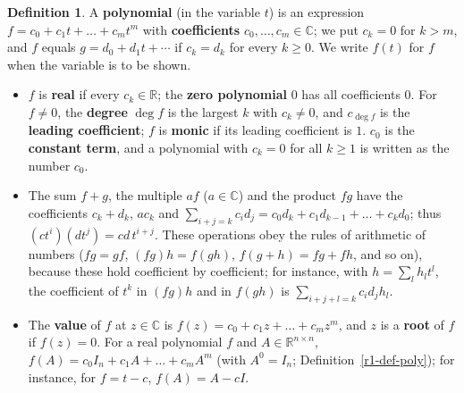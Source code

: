\documentclass[12pt]{article}
\newcommand{\R}{\mathbb R}
\theoremstyle{definition}
\newtheorem{definition}[theorem]{Definition}
\begin{document}
\begin{definition}\label{r7-def-polynomial}
A \textbf{polynomial} (in the variable \(t\)) is an expression \(f=c_0+c_1t+\dots+c_mt^m\) with \textbf{coefficients}
\(c_0,\dots,c_m\in\mathbb C\); we put \(c_k=0\) for \(k>m\), and \(f\) equals \(g=d_0+d_1t+\cdots\) if \(c_k=d_k\) for every
\(k\geqslant0\). We write \(f(t)\) for \(f\) when the variable is to be shown.
\begin{itemize}
\item \(f\) is \textbf{real} if every \(c_k\in\R\); the \textbf{zero polynomial} \(0\) has all coefficients \(0\). For
\(f\ne0\), the \textbf{degree} \(\deg f\) is the largest \(k\) with \(c_k\ne0\), and \(c_{\deg f}\) is the
\textbf{leading coefficient}; \(f\) is \textbf{monic} if its leading coefficient is \(1\). \(c_0\) is the
\textbf{constant term}, and a polynomial with \(c_k=0\) for all \(k\geqslant1\) is written as the number \(c_0\).
\item The sum \(f+g\), the multiple \(af\) (\(a\in\mathbb C\)) and the product \(fg\) have the coefficients \(c_k+d_k\),
\(ac_k\) and \(\sum_{i+j=k}c_id_j=c_0d_k+c_1d_{k-1}+\dots+c_kd_0\); thus \((ct^i)(dt^j)=cd\,t^{i+j}\). These operations
obey the rules of arithmetic of numbers (\(fg=gf\), \((fg)h=f(gh)\), \(f(g+h)=fg+fh\), and so on), because these hold
coefficient by coefficient; for instance, with \(h=\sum_lh_lt^l\), the coefficient of \(t^k\) in \((fg)h\) and in
\(f(gh)\) is \(\sum_{i+j+l=k}c_id_jh_l\).
\item The \textbf{value} of \(f\) at \(z\in\mathbb C\) is \(f(z)=c_0+c_1z+\dots+c_mz^m\), and \(z\) is a \textbf{root} of \(f\)
if \(f(z)=0\). For a real polynomial \(f\) and \(A\in\R^{n\times n}\), \(f(A)=c_0I_n+c_1A+\dots+c_mA^m\) (with
\(A^0=I_n\); Definition~\ref{r1-def-poly}); for instance, for \(f=t-c\), \(f(A)=A-cI\).
\end{itemize}
\end{definition}
\end{document}
